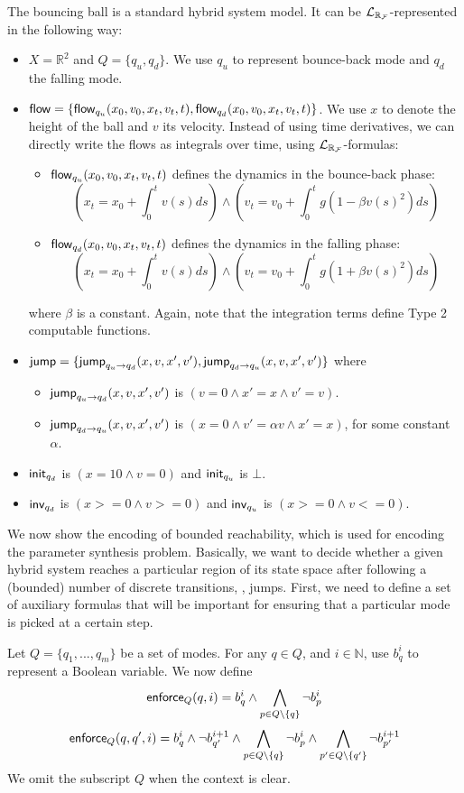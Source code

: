 \begin{example}
The bouncing ball is a standard hybrid system model. It can be $\mathcal{L}_{\mathbb{R}_{\mathcal{F}}}$-represented in the following way:
\begin{itemize}
\item $X = \mathbb{R}^2$ and $Q = \{q_u, q_d\}$. We use $q_u$ to represent bounce-back mode and $q_d$ the falling mode.
\item $\mathsf{flow} = \{\mathsf{flow}_{q_u}(x_0, v_0, x_t, v_t, t), \mathsf{flow}_{q_d}(x_0, v_0, x_t, v_t, t)\}$. We use $x$ to denote the height of the ball and $v$ its velocity. Instead of using time derivatives, we can directly write the flows as integrals over time, using $\mathcal{L}_{\mathbb{R}_{\mathcal{F}}}$-formulas:
\begin{itemize}
\item $\mathsf{flow}_{q_u}(x_0, v_0, x_t, v_t, t)$ defines the dynamics in the bounce-back phase:
$$(x_t = x_0 + \int_0^{t} v(s) ds) \wedge (v_t = v_0 + \int_0^t g(1-\beta v(s)^2) ds)$$
\item $\mathsf{flow}_{q_d}(x_0, v_0, x_t, v_t, t)$ defines the dynamics in the falling phase:
$$(x_t = x_0 + \int_0^{t} v(s) ds) \wedge (v_t = v_0 + \int_0^t g(1+\beta v(s)^2) ds)$$
\end{itemize}where
$\beta$ is a constant. Again, note that the integration terms define Type 2 computable functions.
\item $\mathsf{jump} = \{\mathsf{jump}_{q_u \rightarrow q_d} (x, v, x', v'), \mathsf{jump}_{q_d \rightarrow q_u} (x, v, x', v')\}$ where
\begin{itemize}
\item $\mathsf{jump}_{q_u \rightarrow q_d} (x, v, x', v')$ is $(v= 0 \wedge x' = x \wedge v' = v)$.
\item $\mathsf{jump}_{q_d \rightarrow q_u} (x, v, x', v')$ is $(x= 0 \wedge v' = \alpha v\wedge x'=x)$,  for some constant $\alpha$.
\end{itemize}
\item $\mathsf{init}_{q_d}$ is $(x=10 \wedge v=0)$ and $\mathsf{init}_{q_u}$ is $\bot$.
\item $\mathsf{inv}_{q_d}$ is $(x>=0 \wedge v>=0)$ and $\mathsf{inv}_{q_u}$ is $(x>=0 \wedge v<=0)$.
\end{itemize}
\end{example}

We now show the encoding of bounded reachability, which is used for encoding the parameter synthesis
problem. Basically, we want to decide whether a given 
hybrid system reaches a particular region of its state space after following a (bounded) number
of discrete transitions, \ie, jumps. First, we need to define a set of auxiliary formulas that 
will be important for ensuring that a particular mode is picked at a certain step.
\begin{definition}
Let $Q = \{q_1,...,q_m\}$ be a set of modes. For any $q\in Q$, and $i\in\mathbb{N}$, use  $b_{q}^i$ to represent a Boolean variable. We now define
$$\mathsf{enforce}_Q(q,i) = b^i_{q} \wedge \bigwedge_{p\in Q\setminus\{q\}}\neg b^{i}_{p}$$
$$\mathsf{enforce}_Q(q, q',i) = b^{i}_{q}\wedge \neg b^{i+1}_{q'} \wedge \bigwedge_{p\in Q\setminus\{q\}} \neg b^i_{p} \wedge \bigwedge_{p'\in Q\setminus\{q'\}} \neg b^{i+1}_{p'}$$
We omit the subscript $Q$ when the context is clear.\end{definition}

